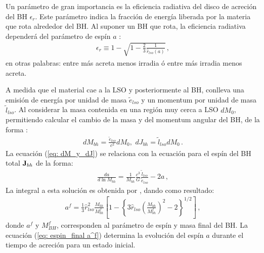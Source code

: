 %
Un parámetro de gran importancia es la eficiencia radiativa del disco de acreción del BH $\epsilon_{r}$. Este parámetro indica la fracción de energía liberada por la materia que rota alrededor del BH. Al suponer un BH que rota, la eficiencia radiativa dependerá del parámetro de espín $a$ \cite{novikov1973}:
%
\begin{align}
    \epsilon_{r} \equiv 1- \sqrt{1-\frac{2}{3}\frac{1}{\hat{r}_{lso}(a)}}\,,
    \label{eq: eficiencia radiativa}
\end{align}
%
en otras palabras: entre más acreta menos irradia ó entre más irradia menos acreta.

A medida que el material cae a la LSO y posteriormente al BH, conlleva  una emisión de energía por unidad de masa $\widetilde{e}_{lso}$ y un momentum por unidad de masa $\widetilde{l}_{lso}$. Al considerar la masa contenida en una región muy cerca a LSO $dM_{0}$, permitiendo calcular el cambio de la masa y del momentum angular del BH, de la forma \cite{fanidakis2011}:
%
\begin{align}
    dM_{bh}=\frac{\widetilde{e}_{lso}}{c^{2}}dM_{0}, \, \, dJ_{bh}=\widetilde{l}_{lso}dM_{0}\,.
    \label{eq: dM_y_dJ}
\end{align}
%
La ecuación (\ref{eq: dM_y_dJ}) se relaciona con la ecuación para el espín del BH total ${\bf{J}}_{bh}$ de la forma:
%
\begin{align}
    \frac{da}{d\ln{M_{bh}}}=\frac{1}{M_{bh}}\frac{c^{3}}{G}\frac{\widetilde{l}_{lso}}{\widetilde{e}_{lso}}-2a\,,
\end{align}
%
La integral a esta solución es obtenida por \cite{bardeen1970}, dando como resultado: 
\begin{align}
    a^{f}=\frac{1}{3}\hat{r}_{lso}^{2}\frac{M_{bh}}{M_{bh}^{f}}\left[1- \left\{3\hat{r}_{lso}\left(\frac{M_{bh}}{M^{f}_{bh}} \right)^{2}-2 \right\}^{1/2} \right]\,,
    \label{eq: espin_final a^f}
\end{align}
donde $a^{f}$ y $M_{BH}^{f}$, corresponden al parámetro de espín y masa final del BH. La ecuación (\ref{eq: espin_final a^f}) determina la evolución del espín $a$ durante el tiempo de acreción para un estado inicial. 

